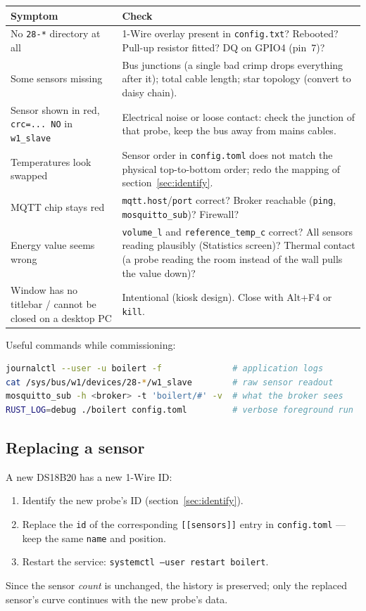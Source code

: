 \documentclass[11pt,a4paper,parskip=half]{scrartcl}
\newcommand{\code}[1]{\texttt{#1}}
\begin{document}
\begin{center}
\begin{tabularx}{\textwidth}{@{}lX@{}}
\toprule
\textbf{Symptom} & \textbf{Check}\\
\midrule
No \code{28-*} directory at all &
1-Wire overlay present in \code{config.txt}? Rebooted? Pull-up resistor
fitted? DQ on GPIO4 (pin~7)?\\
\addlinespace
Some sensors missing &
Bus junctions (a single bad crimp drops everything after it); total cable
length; star topology (convert to daisy chain).\\
\addlinespace
Sensor shown in red, \code{crc=... NO} in \code{w1\_slave} &
Electrical noise or loose contact: check the junction of that probe, keep the
bus away from mains cables.\\
\addlinespace
Temperatures look swapped &
Sensor order in \code{config.toml} does not match the physical top-to-bottom
order; redo the mapping of section~\ref{sec:identify}.\\
\addlinespace
MQTT chip stays red &
\code{mqtt.host}/\code{port} correct? Broker reachable
(\code{ping}, \code{mosquitto\_sub})? Firewall?\\
\addlinespace
Energy value seems wrong &
\code{volume\_l} and \code{reference\_temp\_c} correct? All sensors reading
plausibly (Statistics screen)? Thermal contact (a probe reading the room
instead of the wall pulls the value down)?\\
\addlinespace
Window has no titlebar / cannot be closed on a desktop PC &
Intentional (kiosk design). Close with Alt+F4 or \code{kill}.\\
\bottomrule
\end{tabularx}
\end{center}

Useful commands while commissioning:

\begin{lstlisting}[language=bash]
journalctl --user -u boilert -f              # application logs
cat /sys/bus/w1/devices/28-*/w1_slave        # raw sensor readout
mosquitto_sub -h <broker> -t 'boilert/#' -v  # what the broker sees
RUST_LOG=debug ./boilert config.toml         # verbose foreground run
\end{lstlisting}

\subsection{Replacing a sensor}

A new DS18B20 has a new 1-Wire ID:
\begin{enumerate}
  \item Identify the new probe's ID (section~\ref{sec:identify}).
  \item Replace the \code{id} of the corresponding \code{[[sensors]]} entry
        in \code{config.toml} --- keep the same \code{name} and position.
  \item Restart the service: \code{systemctl --user restart boilert}.
\end{enumerate}
Since the sensor \emph{count} is unchanged, the history is preserved; only
the replaced sensor's curve continues with the new probe's data.
\end{document}
